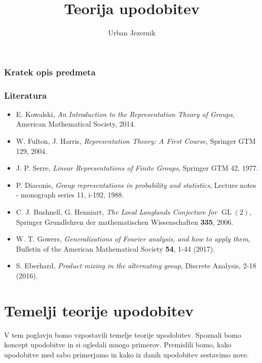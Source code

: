 \documentclass[11pt]{book}
\title{\bf Teorija upodobitev}
\author{Urban Jezernik}
\DeclareMathOperator\GL{GL}
\def\literatura{\color{modra}}
\theoremstyle{definition}
\theoremstyle{zgled}
\theoremstyle{odprtproblem}
\theoremstyle{domacanaloga}
\theoremstyle{izrek}
\begin{document}
\baselineskip=14pt

\maketitle

\setcounter{tocdepth}{1}
\tableofcontents

\newpage

\subsection*{Kratek opis predmeta}


\subsection*{Literatura}

\begin{itemize}
\item {\literatura E. Kowalski, {\em An Introduction to the Representation Theory of Groups}, American Mathematical Society, 2014.} 
\item {\literatura W. Fulton, J. Harris, {\em Representation Theory: A First Course}, Springer GTM 129, 2004.}
\item {\literatura J. P. Serre, {\em Linear Representations of Finite Groups}, Springer GTM 42, 1977.}
\item {\literatura P. Diaconis, {\em Group representations in probability and statistics}, Lecture notes - monograph series 11, i-192, 1988.}
\item {\literatura C. J. Bushnell, G. Henniart, {\em The Local Langlands Conjecture for $\GL(2)$}, Springer Grundlehren der mathematischen Wissenschaften \textbf{335}, 2006.}
\item {\literatura W. T. Gowers, {\em Generalizations of Fourier analysis, and how to apply them},  Bulletin of the American Mathematical Society \textbf{54}, 1-44 (2017).}
\item {\literatura S. Eberhard, {\em Product mixing in the alternating group}, Discrete Analysis, 2-18 (2016).}
\end{itemize}

\chapter{Temelji teorije upodobitev}

V tem poglavju bomo vzpostavili temelje teorije upodobitev. Spoznali bomo koncept upodobitve in si ogledali mnogo primerov. Premislili bomo, kako upodobitve med sabo primerjamo in kako iz danih upodobitev sestavimo nove.
\end{document}
